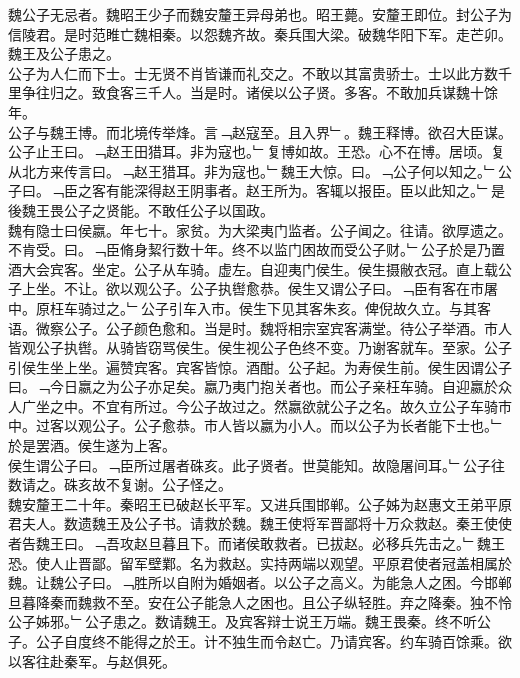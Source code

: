 \documentclass{zhvt-classic}
\begin{document}

\hspace*{2em}魏公子无忌者。魏昭王少子而魏安釐王异母弟也。昭王薨。安釐王即位。封公子为信陵君。是时范睢亡魏相秦。以怨魏齐故。秦兵围大梁。破魏华阳下军。走芒卯。魏王及公子患之。\\
\hspace*{2em}公子为人仁而下士。士无贤不肖皆谦而礼交之。不敢以其富贵骄士。士以此方数千里争往归之。致食客三千人。当是时。诸侯以公子贤。多客。不敢加兵谋魏十馀年。\\
\hspace*{2em}公子与魏王博。而北境传举烽。言﹁赵寇至。且入界﹂。魏王释博。欲召大臣谋。公子止王曰。﹁赵王田猎耳。非为寇也。﹂复博如故。王恐。心不在博。居顷。复从北方来传言曰。﹁赵王猎耳。非为寇也。﹂魏王大惊。曰。﹁公子何以知之。﹂公子曰。﹁臣之客有能深得赵王阴事者。赵王所为。客辄以报臣。臣以此知之。﹂是後魏王畏公子之贤能。不敢任公子以国政。\\
\hspace*{2em}魏有隐士曰侯嬴。年七十。家贫。为大梁夷门监者。公子闻之。往请。欲厚遗之。不肯受。曰。﹁臣脩身絜行数十年。终不以监门困故而受公子财。﹂公子於是乃置酒大会宾客。坐定。公子从车骑。虚左。自迎夷门侯生。侯生摄敝衣冠。直上载公子上坐。不让。欲以观公子。公子执辔愈恭。侯生又谓公子曰。﹁臣有客在市屠中。原枉车骑过之。﹂公子引车入巿。侯生下见其客朱亥。俾倪故久立。与其客语。微察公子。公子颜色愈和。当是时。魏将相宗室宾客满堂。待公子举酒。巿人皆观公子执辔。从骑皆窃骂侯生。侯生视公子色终不变。乃谢客就车。至家。公子引侯生坐上坐。遍赞宾客。宾客皆惊。酒酣。公子起。为寿侯生前。侯生因谓公子曰。﹁今日嬴之为公子亦足矣。嬴乃夷门抱关者也。而公子亲枉车骑。自迎嬴於众人广坐之中。不宜有所过。今公子故过之。然嬴欲就公子之名。故久立公子车骑巿中。过客以观公子。公子愈恭。巿人皆以嬴为小人。而以公子为长者能下士也。﹂於是罢酒。侯生遂为上客。\\
\hspace*{2em}侯生谓公子曰。﹁臣所过屠者硃亥。此子贤者。世莫能知。故隐屠间耳。﹂公子往数请之。硃亥故不复谢。公子怪之。\\
\hspace*{2em}魏安釐王二十年。秦昭王已破赵长平军。又进兵围邯郸。公子姊为赵惠文王弟平原君夫人。数遗魏王及公子书。请救於魏。魏王使将军晋鄙将十万众救赵。秦王使使者告魏王曰。﹁吾攻赵旦暮且下。而诸侯敢救者。已拔赵。必移兵先击之。﹂魏王恐。使人止晋鄙。留军壁鄴。名为救赵。实持两端以观望。平原君使者冠盖相属於魏。让魏公子曰。﹁胜所以自附为婚姻者。以公子之高义。为能急人之困。今邯郸旦暮降秦而魏救不至。安在公子能急人之困也。且公子纵轻胜。弃之降秦。独不怜公子姊邪。﹂公子患之。数请魏王。及宾客辩士说王万端。魏王畏秦。终不听公子。公子自度终不能得之於王。计不独生而令赵亡。乃请宾客。约车骑百馀乘。欲以客往赴秦军。与赵俱死。\\
\end{document}
